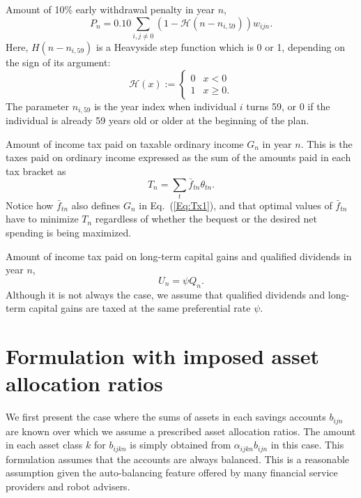 \documentclass{report}[fleqn,11pt]
\begin{document}
\begin{description}[leftmargin=4em,style=multiline]
\item [$P_n$]
	Amount of 10\% early withdrawal penalty in year $n$,
	\begin{equation}
		\label{Eq:PenTax0}
		P_n = 0.10 \sum_{i, j\neq0} (1 - \mathcal{H}(n - n_{i,59})) w_{ijn}.
	\end{equation}
        Here, $H(n - n_{i, 59})$ is a Heavyside step function which is 0 or 1, depending on the sign of
        its argument:
	\begin{equation}
	\mathcal{H}(x) :=
	\begin{cases}
         0 & x < 0 \\
         1 & x \geq 0.
	\end{cases}
	\end{equation}
        The parameter $n_{i, 59}$ is the year index when individual $i$ turns 59,
	or 0 if the individual is already 59 years old or older at the beginning of the plan.

\item [$T_n$]
	Amount of income tax paid on taxable ordinary income $G_n$ in year $n$.
	This is the taxes paid on ordinary income expressed as the sum of the amounts
	paid in each tax bracket as
	\begin{equation}
		\label{Eq:IncTax1}
		T_n = \sum_t \bar{f}_{tn}\theta_{tn}.
	\end{equation}
	Notice how $\bar{f}_{tn}$ also defines $G_n$ in Eq.~(\ref{Eq:Tx1}), and that optimal
	values of $\bar{f}_{tn}$ have to minimize $T_n$ regardless of whether the bequest or the desired
	net spending is being maximized.

\item [$U_n$]
	Amount of income tax paid on long-term capital gains and qualified dividends in year $n$,
	\begin{equation}
		U_n = \psi Q_n.
	\end{equation}
	Although it is not always the case, we assume that qualified dividends and long-term
	capital gains are taxed at the same preferential rate $\psi$.

\end{description}

\chapter{Formulation with imposed asset allocation ratios}
We first present the case where the sums of assets in each savings accounts $b_{ijn}$ are known
over which we assume a prescribed asset allocation ratios.
The amount in each asset class $k$ for $b_{ijkn}$ is simply obtained
from $\alpha_{ijkn} b_{ijn}$ in this case.
This formulation assumes that the accounts are always balanced. This is
a reasonable assumption given the auto-balancing feature offered by many financial service
providers and robot advisers.
\end{document}
